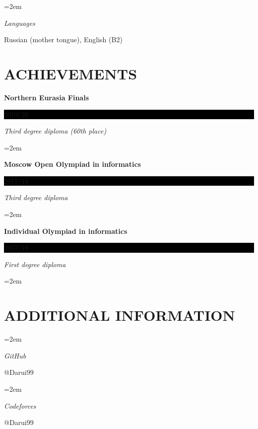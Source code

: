 \documentclass[paper=a4,fontsize=11pt]{scrartcl} %
\newlength{\spacebox}
\newcommand{\sepspace}{\vspace*{1em}}		%
\newcommand{\NewPart}[1]{\section*{\uppercase{#1}}}
\newcommand{\PersonalEntry}[2]{
		\noindent\hangindent=2em\hangafter=0 %
		\parbox{\spacebox}{        %
		\textit{#1}}		       %
		\hspace{1.5em} #2 \par}    %
\newcommand{\SkillsEntry}[2]{      %
		\noindent\hangindent=2em\hangafter=0 %
		\parbox{\spacebox}{        %
		\textit{#1}}			   %
		\hspace{1.5em} #2 \par}    %
\newcommand{\EducationEntry}[4]{
		\noindent \textbf{#1} \hfill      %
		\colorbox{Black}{%
			\parbox{6em}{%
			\hfill\color{White}#2}} \par  %
		\noindent \textit{#3} \par        %
		\noindent\hangindent=2em\hangafter=0 \small #4 %
		\normalsize \par}
\begin{document}
\SkillsEntry{Languages}{Russian (mother tongue), English (B2)}
\sepspace

\NewPart{Achievements}{}

\EducationEntry{Northern Eurasia Finals}{2019/20}{Third degree diploma (60th place)}
\sepspace

\EducationEntry{Moscow Open Olympiad in informatics}{2017/18}{Third degree diploma}
\sepspace

\EducationEntry{Individual Olympiad in informatics}{2017/18}{First degree diploma}
\sepspace

\NewPart{Additional information}{}

\SkillsEntry{GitHub}{@Darui99}
\sepspace

\SkillsEntry{Codeforces}{@Darui99}
\end{document}
